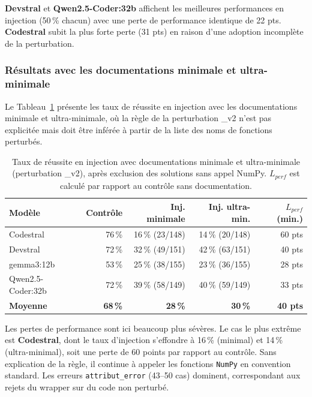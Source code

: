 \documentclass[11pt, a4paper]{article}
\begin{document}
\textbf{Devstral} et \textbf{Qwen2.5-Coder:32b} affichent les meilleures performances en injection (50\,\% chacun) avec une perte de performance identique de 22 pts. \textbf{Codestral} subit la plus forte perte (31 pts) en raison d'une adoption incomplète de la perturbation.


\subsubsection{Résultats avec les documentations minimale et ultra-minimale}

Le Tableau~\ref{tab:results_v2} présente les taux de réussite en injection avec les documentations minimale et ultra-minimale, où la règle de la perturbation \_v2 n'est pas explicitée mais doit être inférée à partir de la liste des noms de fonctions perturbés.

\begin{table}[htbp]
\centering
\caption{Taux de réussite en injection avec documentations minimale et ultra-minimale (perturbation \_v2), après exclusion des solutions sans appel NumPy. $L_{perf}$ est calculé par rapport au contrôle sans documentation.}
\label{tab:results_v2}
\begin{tabular}{lrrrr}
\toprule
\textbf{Modèle} & \textbf{Contrôle} & \textbf{Inj. minimale} & \textbf{Inj. ultra-min.} & \textbf{$L_{perf}$ (min.)} \\
\midrule
Codestral         & 76\,\% & 16\,\% (23/148) & 14\,\% (20/148) & 60 pts \\
Devstral          & 72\,\% & 32\,\% (49/151) & 42\,\% (63/151) & 40 pts \\
gemma3:12b        & 53\,\% & 25\,\% (38/155) & 23\,\% (36/155) & 28 pts \\
Qwen2.5-Coder:32b & 72\,\% & 39\,\% (58/149) & 40\,\% (59/149) & 33 pts \\
\midrule
\textbf{Moyenne}  & \textbf{68\,\%} & \textbf{28\,\%} & \textbf{30\,\%} & \textbf{40 pts} \\
\bottomrule
\end{tabular}
\end{table}

Les pertes de performance sont ici beaucoup plus sévères. Le cas le plus extrême est \textbf{Codestral}, dont le taux d'injection s'effondre à 16\,\% (minimal) et 14\,\% (ultra-minimal), soit une perte de 60 points par rapport au contrôle. Sans explication de la règle, il continue à appeler les fonctions \texttt{NumPy} en convention standard. Les erreurs \texttt{attribut\_error} (43--50 cas) dominent, correspondant aux rejets du wrapper sur du code non perturbé.
\end{document}
